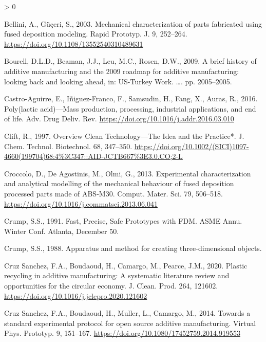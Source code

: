 \documentclass[
]{article}
\newlength{\cslhangindent}
\newenvironment{CSLReferences}[2] %
 {%
  \setlength{\parindent}{0pt}
  \ifodd #1 \everypar{\setlength{\hangindent}{\cslhangindent}}\ignorespaces\fi
  \ifnum #2 > 0
  \setlength{\parskip}{#2\baselineskip}
  \fi
 }%
 {}
\begin{document}
\begin{CSLReferences}{1}{0}
\leavevmode\hypertarget{ref-Bellini2003}{}%
Bellini, A., Güçeri, S., 2003. {Mechanical characterization of parts
fabricated using fused deposition modeling}. Rapid Prototyp. J. 9,
252--264. \url{https://doi.org/10.1108/13552540310489631}

\leavevmode\hypertarget{ref-Bourell2009}{}%
Bourell, D.L.D., Beaman, J.J., Leu, M.C., Rosen, D.W., 2009. {A brief
history of additive manufacturing and the 2009 roadmap for additive
manufacturing: looking back and looking ahead}, in: US-Turkey Work.
{\ldots{}}. pp. 2005--2005.

\leavevmode\hypertarget{ref-Castro-Aguirre2016}{}%
Castro-Aguirre, E., Iñiguez-Franco, F., Samsudin, H., Fang, X., Auras,
R., 2016. {Poly(lactic acid)---Mass production, processing, industrial
applications, and end of life}. Adv. Drug Deliv. Rev.
\url{https://doi.org/10.1016/j.addr.2016.03.010}

\leavevmode\hypertarget{ref-Clift1997}{}%
Clift, R., 1997. {Overview Clean Technology---The Idea and the
Practice*}. J. Chem. Technol. Biotechnol. 68, 347--350.
\url{https://doi.org/10.1002/(SICI)1097-4660(199704)68:4\%3C347::AID-JCTB667\%3E3.0.CO;2-L}

\leavevmode\hypertarget{ref-Croccolo2013}{}%
Croccolo, D., De Agostinis, M., Olmi, G., 2013. {Experimental
characterization and analytical modelling of the mechanical behaviour of
fused deposition processed parts made of ABS-M30}. Comput. Mater. Sci.
79, 506--518. \url{https://doi.org/10.1016/j.commatsci.2013.06.041}

\leavevmode\hypertarget{ref-Crump1991}{}%
Crump, S.S., 1991. {Fast, Precise, Safe Prototypes with FDM.} ASME Annu.
Winter Conf. Atlanta, December 50.

\leavevmode\hypertarget{ref-Crump1988}{}%
Crump, S.S., 1988. {Apparatus and method for creating three-dimensional
objects.}

\leavevmode\hypertarget{ref-CruzSanchez2020}{}%
Cruz Sanchez, F.A., Boudaoud, H., Camargo, M., Pearce, J.M., 2020.
{Plastic recycling in additive manufacturing: A systematic literature
review and opportunities for the circular economy}. J. Clean. Prod. 264,
121602. \url{https://doi.org/10.1016/j.jclepro.2020.121602}

\leavevmode\hypertarget{ref-CruzSanchez2014}{}%
Cruz Sanchez, F.A., Boudaoud, H., Muller, L., Camargo, M., 2014.
{Towards a standard experimental protocol for open source additive
manufacturing}. Virtual Phys. Prototyp. 9, 151--167.
\url{https://doi.org/10.1080/17452759.2014.919553}


\end{CSLReferences}
\end{document}
